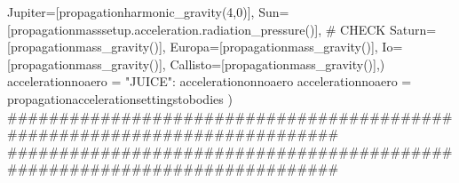 {}Jupiter=[propagationharmonic_gravity(4,0)], Sun=[propagationmasssetup.acceleration.radiation_pressure()], # CHECK Saturn=[propagationmass_gravity()], Europa=[propagationmass_gravity()], Io=[propagationmass_gravity()], Callisto=[propagationmass_gravity()],)\markdownRendererInterblockSeparator
{}
\markdownRendererSectionEnd \markdownRendererSectionBegin
{}\markdownRendererInterblockSeparator
{}accelerationnoaero = {"JUICE": accelerationonnoaero}\markdownRendererInterblockSeparator
{}
\markdownRendererSectionEnd \markdownRendererSectionBegin
{}\markdownRendererInterblockSeparator
{}accelerationnoaero = propagationaccelerationsettingstobodies )\markdownRendererInterblockSeparator
{}###########################################################################\markdownRendererInterblockSeparator
{}
\markdownRendererSectionEnd \markdownRendererSectionBegin
{}\markdownRendererInterblockSeparator
{}###########################################################################\markdownRendererInterblockSeparator
{}
\markdownRendererSectionEnd \markdownRendererSectionBegin
{}\markdownRendererInterblockSeparator
{}
\markdownRendererSectionEnd \markdownRendererSectionBegin
{}\markdownRendererInterblockSeparator
{}
\markdownRendererSectionEnd \markdownRendererSectionBegin
{}\markdownRendererInterblockSeparator
{}
\markdownRendererSectionEnd \markdownRendererSectionBegin
{}\markdownRendererInterblockSeparator
